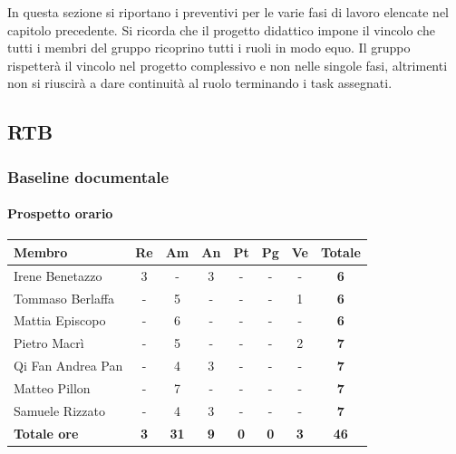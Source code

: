 In questa sezione si riportano i preventivi per le varie fasi di lavoro elencate nel capitolo precedente. \newline
Si ricorda che il progetto didattico impone il vincolo che tutti i membri del gruppo ricoprino tutti i ruoli in modo equo.
Il gruppo rispetterà il vincolo nel progetto complessivo e non nelle singole fasi, 
altrimenti non si riuscirà a dare continuità al ruolo terminando i task assegnati.

\subsection{RTB}
\subsubsection{Baseline documentale}
\paragraph{Prospetto orario}
\begin{center}
	\renewcommand{\arraystretch}{1.8} %
	\begin{tabular}{ |m{10em}|c|c|c|c|c|c|c| }
	\hline
	\textbf{Membro} & \textbf{Re} & \textbf{Am} &  \textbf{An} &  \textbf{Pt} &  \textbf{Pg} &  \textbf{Ve} &  \textbf{Totale}\\
    \hline
    Irene Benetazzo   & 3 & - & 3 & - & - & - & \textbf{6} \\
    \hline
    Tommaso Berlaffa  & - & 5 & - & - & - & 1 & \textbf{6} \\
    \hline
    Mattia Episcopo   & - & 6 & - & - & - & - & \textbf{6} \\
    \hline
    Pietro Macrì      & - & 5 & - & - & - & 2 & \textbf{7} \\
    \hline
    Qi Fan Andrea Pan & - & 4 & 3 & - & - & - & \textbf{7} \\
    \hline
    Matteo Pillon     & - & 7 & - & - & - & - & \textbf{7} \\
    \hline
    Samuele Rizzato   & - & 4 & 3 & - & - & - & \textbf{7} \\
    \hline
    \textbf{Totale ore} & \textbf{3} & \textbf{31} &  \textbf{9} &  \textbf{0} &  \textbf{0} &  \textbf{3} &  \textbf{46}\\
    \hline
	\end{tabular}
\end{center}
